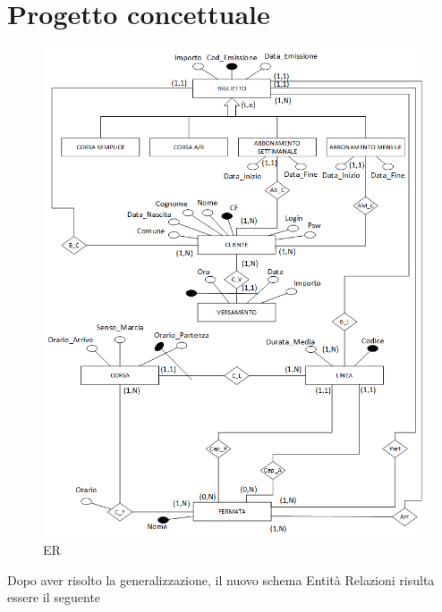\documentclass[a4paper,11pt]{book}
\begin{document}
\chapter{Progetto concettuale}
\begin{figure}[!ht]
\centering
\includegraphics[scale = 0.6]{ER.png}
\caption{ER}
\end{figure}

\clearpage
Dopo aver risolto la generalizzazione, il nuovo schema Entità Relazioni risulta essere il seguente
\end{document}
